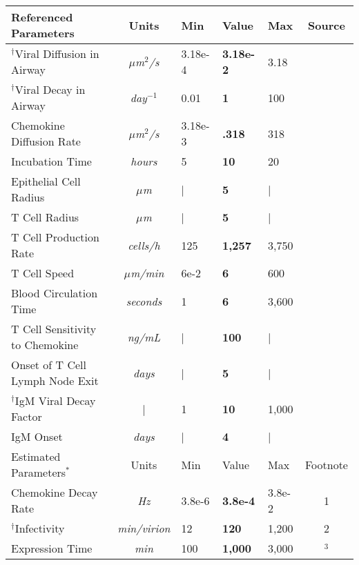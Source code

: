 \documentclass[preprint,10pt,numbers]{elsarticle}
\begin{document}
\begin{table}[!ht]
\begin{center}
\begin{tabular}{| l | c | l l l | c |}
  \hline                        
  Referenced Parameters & Units & Min & Value & Max & Source \\
  \hline
  $^{\dagger}$Viral Diffusion in Airway & \textit{$\mu$m$^2$/s} & 3.18e-4 & \textbf{3.18e-2} & 3.18  & \citep{Beauchemin2006} \\
  $^{\dagger}$Viral Decay in Airway & \textit{day$^{-1}$} & 0.01 & \textbf{1} & 100 & \citep{Lee2009} \\
  Chemokine Diffusion Rate & \textit{$\mu$m$^2$/s} & 3.18e-3 & \textbf{.318} & 318 & \citep{Beauchemin2006} \\
  Incubation Time & \textit{hours} & 5 & \textbf{10} & 20 & \citep{Mitchell2011} \\
  Epithelial Cell Radius & \textit{$\mu$m} & | & \textbf{5} & | & \citep{Elbert1999} \\
  T Cell Radius & \textit{$\mu$m} & | & \textbf{5} & | & \citep{abbas2011cellular} \\
  T Cell Production Rate & \textit{cells/h} & 125 & \textbf{1,257} & 3,750 & \citep{Miao2010a} \\ 
  T Cell Speed & \textit{$\mu$m/min} & 6e-2 & \textbf{6} & 600 & \citep{Egen2011} \\
  Blood Circulation Time & \textit{seconds} & 1 & \textbf{6} & 3,600 & \citep{Banerjee2010b} \\
  T Cell Sensitivity to Chemokine & \textit{ng/mL} & | & \textbf{100} & | & \citep{Nandagopal2011} \\
  Onset of T Cell Lymph Node Exit & \textit{days }& | & \textbf{5} & | & \citep{Banerjee2011} \\
  $^{\dagger}$IgM Viral Decay Factor & | & 1 & \textbf{10} & 1,000 & \citep{Diamond2003} \\
  IgM Onset & \textit{days} & | & \textbf{4} & | & \citep{Diamond2003} \\
  \hline
  \hline                        
  Estimated Parameters$^*$ & Units & Min & Value & Max & Footnote \\
  \hline
  Chemokine Decay Rate & \textit{Hz} & 3.8e-6 & \textbf{3.8e-4} & 3.8e-2 & 1\\
  $^{\dagger}$Infectivity & \textit{min/virion} & 12 & \textbf{120} & 1,200   &  2 \\
  Expression Time & \textit{min} & 100 & \textbf{1,000} & 3,000 & \citep{Mitchell2011}$^3$ \\

\end{tabular}
\end{center}
\end{table}
\end{document}
